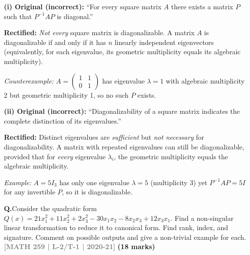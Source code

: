 \documentclass[12pt,a3paper]{article}
\newcommand{\yr}[1]{\hfill\textcolor{gray}{\small\textbf{[#1]}}}
\newcommand{\mk}[1]{\textcolor{orange!70!black}{\small\textbf{(#1 marks)}}}
\newcounter{qnum}
\newcommand{\Q}[1]{%
  \needspace{4\baselineskip}
  \refstepcounter{qnum}
  \vspace{6pt}
  \noindent\textbf{Q\theqnum.}\enspace #1\par
}
\begin{document}
\begin{tcolorbox}[enhanced,breakable,
  colback=cE!4,colframe=cE,boxrule=0.8pt,arc=5pt,
  title={\textbf{Answer --- Rectifying Incorrect Statements on Diagonalization}},
  fonttitle=\bfseries\color{white},colbacktitle=cE]

\textbf{(i) Original (incorrect):} ``For every square matrix $A$ there exists a matrix $P$ such that $P^{-1}AP$ is diagonal.''

\textbf{Rectified:} \emph{Not every} square matrix is diagonalizable. A matrix $A$ is diagonalizable if and only if it has $n$ linearly independent eigenvectors (equivalently, for each eigenvalue, its geometric multiplicity equals its algebraic multiplicity). 

\textit{Counterexample:} $A=\begin{pmatrix}1&1\\0&1\end{pmatrix}$ has eigenvalue $\lambda=1$ with algebraic multiplicity 2 but geometric multiplicity 1, so no such $P$ exists.

\medskip
\textbf{(ii) Original (incorrect):} ``Diagonalizability of a square matrix indicates the complete distinction of its eigenvalues.''

\textbf{Rectified:} Distinct eigenvalues are \emph{sufficient} but \emph{not necessary} for diagonalizability. A matrix with repeated eigenvalues can still be diagonalizable, provided that for \emph{every} eigenvalue $\lambda_i$, the geometric multiplicity equals the algebraic multiplicity.

\textit{Example:} $A=5I_3$ has only one eigenvalue $\lambda=5$ (multiplicity 3) yet $P^{-1}AP=5I$ for any invertible $P$, so it is diagonalizable.

\end{tcolorbox}


\Q{Consider the quadratic form $Q(x) = 21x_1^2 + 11x_2^2 + 2x_3^2 - 30x_1x_2 - 8x_2x_3 + 12x_3x_1$. Find a non-singular linear transformation to reduce it to canonical form. Find rank, index, and signature. Comment on possible outputs and give a non-trivial example for each.
\yr{MATH 259 | L-2/T-1 | 2020-21} \mk{18}}
\end{document}
